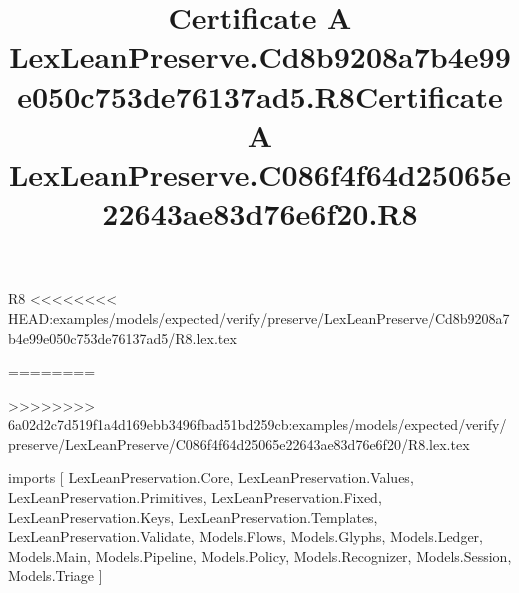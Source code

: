 \begin{lexlean}{R8}
<<<<<<<< HEAD:examples/models/expected/verify/preserve/LexLeanPreserve/Cd8b9208a7b4e99e050c753de76137ad5/R8.lex.tex
\title{Certificate A LexLeanPreserve.Cd8b9208a7b4e99e050c753de76137ad5.R8}
========
\title{Certificate A LexLeanPreserve.C086f4f64d25065e22643ae83d76e6f20.R8}
>>>>>>>> 6a02d2c7d519f1a4d169ebb3496fbad51bd259cb:examples/models/expected/verify/preserve/LexLeanPreserve/C086f4f64d25065e22643ae83d76e6f20/R8.lex.tex
\begin{coremodule}
imports [
  LexLeanPreservation.Core,
  LexLeanPreservation.Values,
  LexLeanPreservation.Primitives,
  LexLeanPreservation.Fixed,
  LexLeanPreservation.Keys,
  LexLeanPreservation.Templates,
  LexLeanPreservation.Validate,
  Models.Flows,
  Models.Glyphs,
  Models.Ledger,
  Models.Main,
  Models.Pipeline,
  Models.Policy,
  Models.Recognizer,
  Models.Session,
  Models.Triage
]


\end{coremodule}
\end{lexlean}
